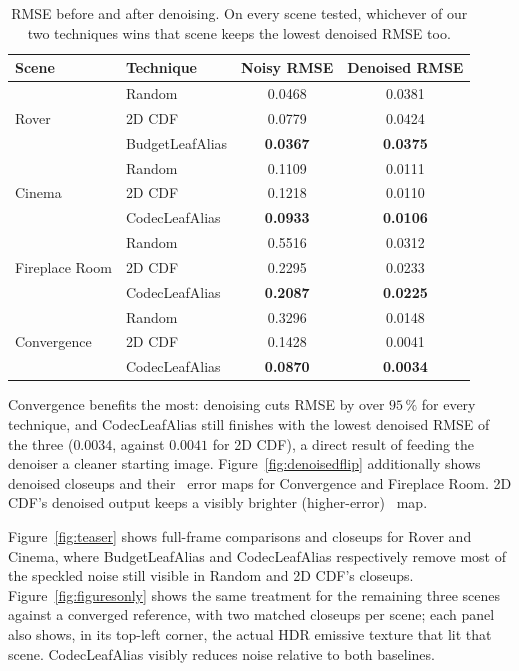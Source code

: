 \documentclass[acmtog,review,anonymous]{acmart}
\begin{document}
\begin{table}[htbp!]
\centering
\small
\caption{RMSE before and after denoising. On every scene tested, whichever of our two techniques wins that scene keeps the lowest denoised RMSE too.}
\label{tab:denoise}
\begin{tabular}{ll cc}
\toprule
Scene & Technique & Noisy RMSE & Denoised RMSE \\
\midrule
\multirow{3}{*}{Rover}
 & Random & 0.0468 & 0.0381 \\
 & 2D CDF & 0.0779 & 0.0424 \\
 & {BudgetLeafAlias} & \textbf{0.0367} & \textbf{0.0375} \\
\midrule
\multirow{3}{*}{Cinema}
 & Random & 0.1109 & 0.0111 \\
 & 2D CDF & 0.1218 & 0.0110 \\
 & {CodecLeafAlias} & \textbf{0.0933} & \textbf{0.0106} \\
\midrule
\multirow{3}{*}{Fireplace Room}
 & Random & 0.5516 & 0.0312 \\
 & 2D CDF & 0.2295 & 0.0233 \\
 & {CodecLeafAlias} & \textbf{0.2087} & \textbf{0.0225} \\
\midrule
\multirow{3}{*}{Convergence}
 & Random & 0.3296 & 0.0148 \\
 & 2D CDF & 0.1428 & 0.0041 \\
 & {CodecLeafAlias} & \textbf{0.0870} & \textbf{0.0034} \\
\bottomrule
\end{tabular}
\end{table}


Convergence benefits the most: denoising cuts RMSE by over $95\,\%$ for every technique, and
CodecLeafAlias still finishes with the lowest denoised RMSE of the three ($0.0034$,
against $0.0041$ for 2D CDF), a direct result of feeding the denoiser a cleaner starting
image. Figure~\ref{fig:denoisedflip} additionally shows
denoised closeups and their \FLIP\  error maps for Convergence and Fireplace Room. 2D CDF's denoised output keeps a visibly brighter (higher-error) \FLIP\ map.

Figure~\ref{fig:teaser} shows full-frame comparisons and closeups for Rover and Cinema, where
BudgetLeafAlias and CodecLeafAlias respectively remove most of the speckled noise still
visible in Random and 2D CDF's closeups. Figure~\ref{fig:figuresonly} shows
the same treatment for the remaining three scenes against a converged reference, with two matched closeups per scene; each panel also shows, in its top-left
corner, the actual HDR emissive texture that lit that scene. CodecLeafAlias visibly reduces
noise relative to both baselines.
\end{document}
